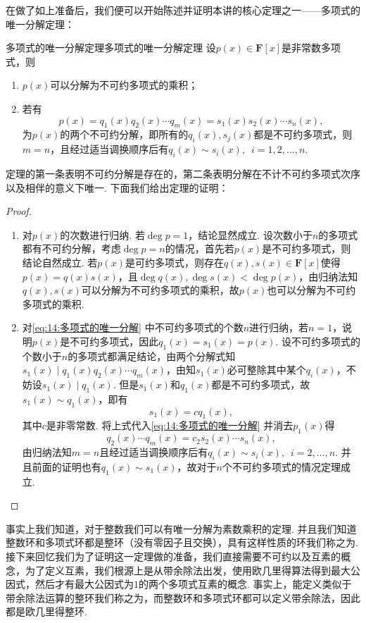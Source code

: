 在做了如上准备后，我们便可以开始陈述并证明本讲的核心定理之一——多项式的唯一分解定理：
\begin{theorem}{多项式的唯一分解定理}{多项式的唯一分解定理}
    设$p(x)\in\mathbf{F}[x]$是非常数多项式，则
    \begin{enumerate}
        \item $p(x)$可以分解为不可约多项式的乘积；
        \item 若有
              \begin{equation} \label{eq:14:多项式的唯一分解}
                  p(x)=q_1(x)q_2(x)\cdots q_m(x)=s_1(x)s_2(x)\cdots s_n(x),
              \end{equation}
              为$p(x)$的两个不可约分解，即所有的$q_i(x),s_j(x)$都是不可约多项式，则$m=n$，且经过适当调换顺序后有$q_i(x)\sim s_i(x),\enspace i=1,2,\ldots,n$.
    \end{enumerate}
\end{theorem}
定理的第一条表明不可约分解是存在的，第二条表明分解在不计不可约多项式次序以及相伴的意义下唯一. 下面我们给出定理的证明：
\begin{proof}
    \begin{enumerate}
        \item 对$p(x)$的次数进行归纳. 若$\deg p=1$，结论显然成立. 设次数小于$n$的多项式都有不可约分解，考虑$\deg p=n$的情况，首先若$p(x)$是不可约多项式，则结论自然成立. 若$p(x)$是可约多项式，则存在$q(x),s(x)\in\mathbf{F}[x]$使得$p(x)=q(x)s(x)$，且$\deg q(x),\deg s(x)<\deg p(x)$，由归纳法知$q(x),s(x)$可以分解为不可约多项式的乘积，故$p(x)$也可以分解为不可约多项式的乘积.
        \item 对\autoref{eq:14:多项式的唯一分解} 中不可约多项式的个数$n$进行归纳，若$n=1$，说明$p(x)$是不可约多项式，因此$q_1(x)=s_1(x)=p(x)$. 设不可约多项式的个数小于$n$的多项式都满足结论，由两个分解式知$s_1(x)\mid q_1(x)q_2(x)\cdots q_m(x)$，由知$s_1(x)$必可整除其中某个$q_i(x)$，不妨设$s_1(x)\mid q_1(x)$. 但是$s_1(x)$和$q_1(x)$都是不可约多项式，故$s_1(x)\sim q_1(x)$，即有
              \[s_1(x)=cq_1(x),\]
              其中$c$是非零常数. 将上式代入\autoref{eq:14:多项式的唯一分解} 并消去$p_1(x)$得
              \[q_2(x)\cdots q_m(x)=c_2s_2(x)\cdots s_n(x),\]
              由归纳法知$m=n$且经过适当调换顺序后有$q_i(x)\sim s_i(x),\enspace i=2,\ldots,n$. 并且前面的证明也有$q_1(x)\sim s_1(x)$，故对于$n$个不可约多项式的情况定理成立.
    \end{enumerate}
\end{proof}

事实上我们知道，对于整数我们可以有唯一分解为素数乘积的定理. 并且我们知道整数环和多项式环都是整环（没有零因子且交换），具有这样性质的环我们称之为. 接下来回忆我们为了证明这一定理做的准备，我们直接需要不可约以及互素的概念，为了定义互素，我们根源上是从带余除法出发，使用欧几里得算法得到最大公因式，然后才有最大公因式为$1$的两个多项式互素的概念. 事实上，能定义类似于带余除法运算的整环我们称之为，而整数环和多项式环都可以定义带余除法，因此都是欧几里得整环.

